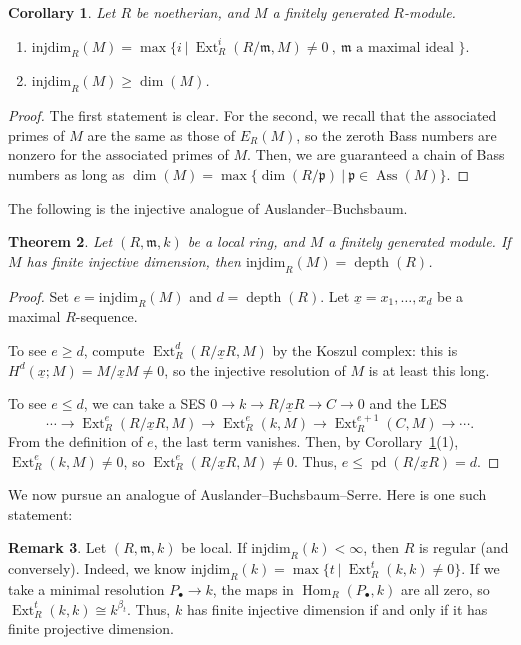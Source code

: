 \documentclass[11pt]{book}
\newtheorem{theorem}{Theorem}[chapter]
\newtheorem{corollary}[theorem]{Corollary}
\numberwithin{equation}{section}
\numberwithin{theorem}{chapter}
\theoremstyle{definition}
\newtheorem*{basic properties}{Basic Properties}
\newtheorem*{Important Remark}{Important Remark}
\newtheorem{remark}[theorem]{Remark}
\theoremstyle{remark}
\newcommand{\m}{\mathfrak{m}}
\newcommand{\p}{\mathfrak{p}}
\newcommand{\Hom}{\operatorname{Hom}}
\newcommand{\Ext}{\operatorname{Ext}}
\newcommand{\Ass}{\operatorname{Ass}}
\renewcommand{\dim}{\operatorname{dim}}
\newcommand{\depth}{\operatorname{depth}}
\newcommand{\pd}{\operatorname{pd}}
\begin{document}
\begin{corollary}\label{inj-dim-maxl} Let $R$ be noetherian, and $M$ a finitely generated $R$-module.
\begin{enumerate}
\item $\mathrm{injdim}_R(M)= \max\{i \ | \ \Ext^i_R(R/\m,M)\neq 0 \ , \ \m \text{  a maximal ideal } \}.$
\item $\mathrm{injdim}_R(M)\geq \dim(M)$.
\end{enumerate}
\end{corollary}
\begin{proof}
The first statement is clear. For the second, we recall that the associated primes of $M$ are the same as those of $E_R(M)$, so the zeroth Bass numbers are nonzero for the associated primes of $M$. Then, we are guaranteed a chain of Bass numbers as long as $\dim(M)=\max\{\dim(R/\p) \ | \ \p\in \Ass(M)\}$.
\end{proof}

The following is the injective analogue of Auslander--Buchsbaum.

\begin{theorem}
	Let $(R,\m,k)$ be a local ring, and $M$ a finitely generated module.  If $M$ has finite injective dimension, then $\mathrm{injdim}_R(M)=\depth(R)$.
\end{theorem}
\begin{proof}
	Set $e=\mathrm{injdim}_R(M)$ and $d=\depth (R)$. Let $\underline{x}=x_1,\dots,x_d$ be a maximal $R$-sequence.
	
	To see $e\geq d$, compute $\Ext^d_R(R/\underline{x}R,M)$ by the Koszul complex: this is $H^d(\underline{x};M)=M/\underline{x}M\neq 0$, so the injective resolution of $M$ is at least this long.
	
	To see $e \leq d$, we can take a SES $0\to k \to R/\underline{x}R \to C \to 0$ and the LES
	\[ \cdots \to \Ext^e_R(R/\underline{x}R,M) \to \Ext^e_R(k,M) \to \Ext^{e+1}_R(C,M) \to \cdots.\]
	From the definition of $e$, the last term vanishes. Then, by Corollary~\ref{inj-dim-maxl}(1), $\Ext^e_R(k,M)\neq 0$, so $\Ext^e_R(R/\underline{x}R,M)\neq 0$. Thus, $e\leq \pd(R/\underline{x}R)=d$.
\end{proof}

We now pursue an analogue of Auslander--Buchsbaum--Serre. Here is one such statement:

\begin{remark}
	Let $(R,\m,k)$ be local. If $\mathrm{injdim}_R(k)<\infty$, then $R$ is regular (and conversely). Indeed, we know
	$\mathrm{injdim}_R(k)=\max\{ t \ | \ \Ext^t_R(k,k)\neq 0\}$. If we take a minimal resolution $P_\bullet \to k$, the maps in $\Hom_R(P_\bullet,k)$ are all zero, so $\Ext^t_R(k,k)\cong k^{\beta_t}$. Thus, $k$ has finite injective dimension if and only if it has finite projective dimension.
\end{remark}
\end{document}
